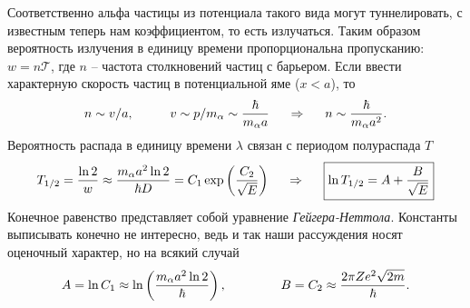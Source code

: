  Соответственно альфа частицы из потенциала такого вида могут туннелировать, с известным теперь нам коэффициентом, то есть излучаться. 
 Таким образом вероятность излучения в единицу времени пропорциональна пропусканию: $w = n \mathcal{T}$, где $n$ -- частота столкновений частиц с барьером.
 Если ввести характерную скорость частиц в потенциальной яме ($x<a$), то 
 \begin{equation*}
 	n \sim v / a,
 	\hspace{1 cm}
 	v \sim p/m_\alpha \sim \frac{\hbar}{m_\alpha a}
 	\hspace{0.5 cm}
 	\Rightarrow
 	\hspace{0.5 cm}
 	n \sim \frac{\hbar}{m_\alpha a^2}.
 \end{equation*}
 Вероятность распада в единицу времени $\lambda$ связан с периодом полураспада $T$
 \begin{equation*}
 	T_{1/2} = \frac{\ln 2}{w} \approx \frac{m_\alpha a^2 \ln 2}{\hbar D} = C_1 \exp\left(\frac{C_2}{\sqrt{E}}\right)
 	\hspace{0.5 cm}
 	\Rightarrow
 	\hspace{0.5 cm}
 	\boxed{\ln T_{1/2} = A + \frac{B}{\sqrt{E}}}
 \end{equation*}
Конечное равенство представляет собой уравнение \textit{Гейгера-Неттола}. Константы выписывать конечно не интересно, ведь и так наши рассуждения носят оценочный характер, но на всякий случай
\begin{equation*}
	A = \ln C_1 \approx \ln \left(\frac{m_\alpha a^2 \ln 2}{\hbar}\right),
	\hspace{1.5 cm}
	B = C_2 \approx \frac{2 \pi Z e^2 \sqrt{2 m}}{\hbar}.
\end{equation*}